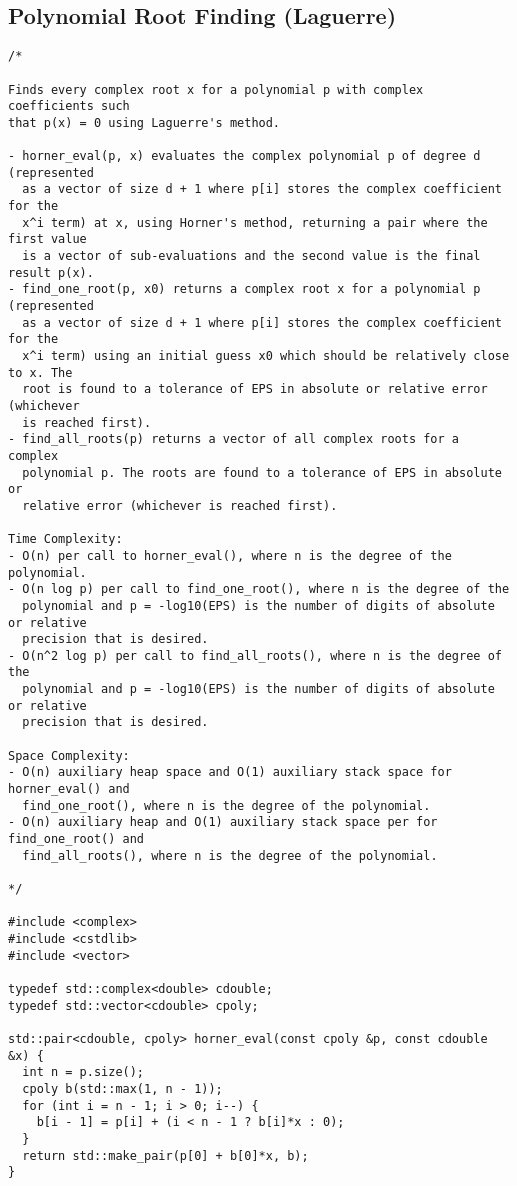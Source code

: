 \subsection{Polynomial Root Finding (Laguerre)}
\begin{lstlisting}
/*

Finds every complex root x for a polynomial p with complex coefficients such
that p(x) = 0 using Laguerre's method.

- horner_eval(p, x) evaluates the complex polynomial p of degree d (represented
  as a vector of size d + 1 where p[i] stores the complex coefficient for the
  x^i term) at x, using Horner's method, returning a pair where the first value
  is a vector of sub-evaluations and the second value is the final result p(x).
- find_one_root(p, x0) returns a complex root x for a polynomial p (represented
  as a vector of size d + 1 where p[i] stores the complex coefficient for the
  x^i term) using an initial guess x0 which should be relatively close to x. The
  root is found to a tolerance of EPS in absolute or relative error (whichever
  is reached first).
- find_all_roots(p) returns a vector of all complex roots for a complex
  polynomial p. The roots are found to a tolerance of EPS in absolute or
  relative error (whichever is reached first).

Time Complexity:
- O(n) per call to horner_eval(), where n is the degree of the polynomial.
- O(n log p) per call to find_one_root(), where n is the degree of the
  polynomial and p = -log10(EPS) is the number of digits of absolute or relative
  precision that is desired.
- O(n^2 log p) per call to find_all_roots(), where n is the degree of the
  polynomial and p = -log10(EPS) is the number of digits of absolute or relative
  precision that is desired.

Space Complexity:
- O(n) auxiliary heap space and O(1) auxiliary stack space for horner_eval() and
  find_one_root(), where n is the degree of the polynomial.
- O(n) auxiliary heap and O(1) auxiliary stack space per for find_one_root() and
  find_all_roots(), where n is the degree of the polynomial.

*/

#include <complex>
#include <cstdlib>
#include <vector>

typedef std::complex<double> cdouble;
typedef std::vector<cdouble> cpoly;

std::pair<cdouble, cpoly> horner_eval(const cpoly &p, const cdouble &x) {
  int n = p.size();
  cpoly b(std::max(1, n - 1));
  for (int i = n - 1; i > 0; i--) {
    b[i - 1] = p[i] + (i < n - 1 ? b[i]*x : 0);
  }
  return std::make_pair(p[0] + b[0]*x, b);
}


\end{lstlisting}
